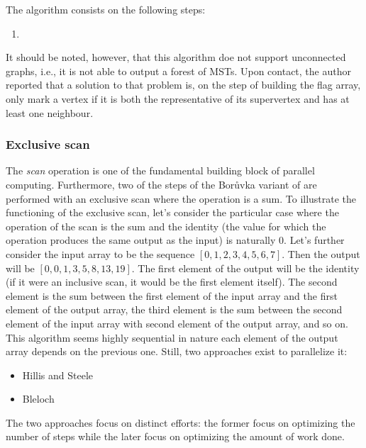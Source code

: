 The algorithm consists on the following steps:

\begin{enumerate}
	\item 
\end{enumerate}


It should be noted, however, that this algorithm doe not support unconnected graphs, i.e., it is not able to output a forest of MSTs.
Upon contact, the author reported that a solution to that problem is, on the step of building the flag array, only mark a vertex if it is both the representative of its supervertex and has at least one neighbour.



\subsubsection{Exclusive scan} The \emph{scan} operation is one of the fundamental building block of parallel computing. 
Furthermore, two of the steps of the Borůvka variant of \cite{Sousa2015} are performed with an exclusive scan where the operation is a sum. 
To illustrate the functioning of the exclusive scan, let's consider the particular case where the operation of the scan is the sum and the identity (the value for which the operation produces the same output as the input) is naturally $0$. Let's further consider the input array to be the sequence $[0,1,2,3,4,5,6,7]$. Then the output will be $[0,0,1,3,5,8,13,19]$. The first element of the output will be the identity (if it were an inclusive scan, it would be the first element itself). The second element is the sum between the first element of the input array and the first element of the output array, the third element is the sum between the second element of the input array with second element of the output array, and so on.
This algorithm seems highly sequential in nature each element of the output array depends on the previous one. 
Still, two approaches exist to parallelize it:

\begin{itemize} 
	\item Hillis and Steele
	\item Bleloch
\end{itemize}

The two approaches focus on distinct efforts: the former focus on optimizing the number of steps while the later focus on optimizing the amount of work done.




